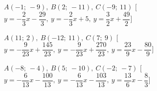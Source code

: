 \begin{esercizio}
\begin{enumeratea}
   [$y = -\dfrac{10}{11} x -\dfrac{10}{11},~y = -\dfrac{10}{11} x 
-\dfrac{65}{11},~y = \dfrac{11}{10} x +\dfrac{91}{5}$]
  \item  $A(-1;~-9),~B(2;~-11),~C(-9;~11)$ \hfill 
   [$y = -\dfrac{2}{3} x -\dfrac{29}{3},~y = -\dfrac{2}{3} x +5,~y = 
\dfrac{3}{2} x +\dfrac{49}{2}$]
  \item  $A(11;~2),~B(-12;~11),~C(7;~9)$ \hfill 
   [$y = -\dfrac{9}{23} x +\dfrac{145}{23},~y = -\dfrac{9}{23} x 
+\dfrac{270}{23},~y = \dfrac{23}{9} x -\dfrac{80}{9}$]
  \item  $A(-8;~-4),~B(5;~-10),~C(-2;~-7)$ \hfill 
   [$y = -\dfrac{6}{13} x -\dfrac{100}{13},~y = -\dfrac{6}{13} x 
-\dfrac{103}{13},~y = \dfrac{13}{6} x -\dfrac{8}{3}$]
 \end{enumeratea}
\end{esercizio}

\subsubsection*{}

